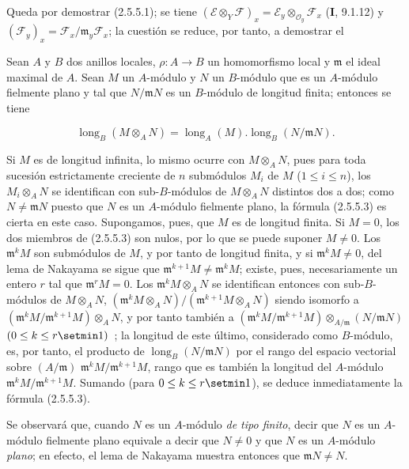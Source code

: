 Queda por demostrar (2.5.5.1); se tiene
$(\mathscr E\otimes_Y\mathscr F)_x
=\mathscr E_y\otimes_{\mathcal O_y}\mathscr F_x$
(\textbf{I}, 9.1.12)
y
$(\mathscr F_y)_x=\mathscr F_x/\mathfrak m_y\mathscr F_x$; la cuestión se reduce, por
tanto, a demostrar el

\begin{lemma}[2.5.5.2]
\label{IV.2.5.5.2-fr}
Sean $A$ y $B$ dos anillos locales, $\rho:A\to B$ un homomorfismo local y
$\mathfrak m$ el ideal maximal de $A$. Sean $M$ un $A$-módulo y $N$ un
$B$-módulo que es un $A$-módulo fielmente plano y tal que
$N/\mathfrak mN$ es un $B$-módulo de longitud finita; entonces se tiene
\end{lemma}

\begin{env}[2.5.5.3]
\label{IV.2.5.5.3-fr}
\[
\operatorname{long}_B(M\otimes_A N)
=\operatorname{long}_A(M).
 \operatorname{long}_B(N/\mathfrak mN).
\]
\end{env}

Si $M$ es de longitud infinita, lo mismo ocurre con $M\otimes_A N$, pues para
toda sucesión estrictamente creciente de $n$ submódulos $M_i$ de $M$
($1\leq i\leq n$), los $M_i\otimes_A N$ se identifican con sub-$B$-módulos de
$M\otimes_A N$ distintos dos a dos; como $N\ne\mathfrak mN$ puesto que $N$ es
un $A$-módulo fielmente plano, la fórmula (2.5.5.3) es cierta en este caso.
Supongamos, pues, que $M$ es de longitud finita. Si $M=0$, los dos miembros de
(2.5.5.3) son nulos, por lo que se puede suponer $M\ne0$. Los
$\mathfrak m^kM$ son submódulos de $M$, y por tanto de longitud finita, y si
$\mathfrak m^kM\ne0$, del lema de Nakayama se sigue que
$\mathfrak m^{k+1}M\ne\mathfrak m^kM$; existe, pues, necesariamente un entero
$r$ tal que $\mathfrak m^rM=0$. Los $\mathfrak m^kM\otimes_A N$ se identifican
entonces con sub-$B$-módulos de $M\otimes_A N$,
$(\mathfrak m^kM\otimes_A N)/(\mathfrak m^{k+1}M\otimes_A N)$
siendo isomorfo a
$(\mathfrak m^kM/\mathfrak m^{k+1}M)\otimes_A N$,
y por tanto también a
$(\mathfrak m^kM/\mathfrak m^{k+1}M)
\otimes_{A/\mathfrak m}(N/\mathfrak mN)$
$(0\leq k\leq r\setmin 1)$~;
la longitud de este último, considerado como $B$-módulo, es, por tanto, el
producto de $\operatorname{long}_B(N/\mathfrak mN)$ por el rango del espacio
vectorial sobre $(A/\mathfrak m)$
$\mathfrak m^kM/\mathfrak m^{k+1}M$, rango que es también la longitud del
$A$-módulo $\mathfrak m^kM/\mathfrak m^{k+1}M$. Sumando (para
$0\leq k\leq r\setmin 1$), se deduce inmediatamente la fórmula (2.5.5.3).

\begin{remark}[2.5.5.4]
\label{IV.2.5.5.4-fr}
Se observará que, cuando $N$ es un $A$-módulo \emph{de tipo finito}, decir que
$N$ es un $A$-módulo fielmente plano equivale a decir que $N\ne0$ y que $N$
es un $A$-módulo \emph{plano}; en efecto, el lema de Nakayama muestra entonces que
$\mathfrak mN\ne N$.
\end{remark}
